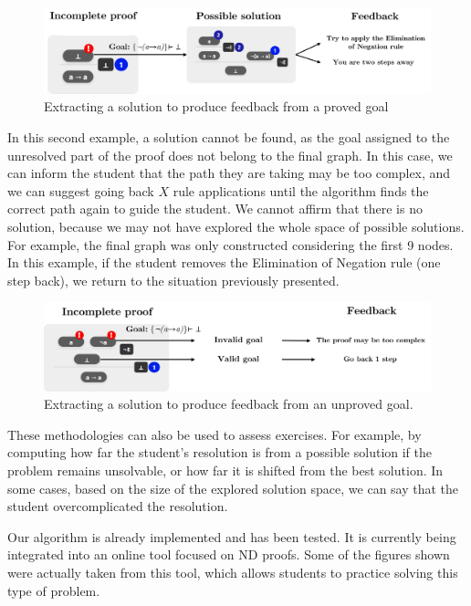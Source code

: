 \begin{figure}
    \centering
    \includegraphics[width=1\linewidth]{resources/trim-pos-feed.jpg}
    \caption{Extracting a solution to produce feedback from a proved goal}
    \label{fig:extract-solution}
\end{figure}

In this second example, a solution cannot be found, as the goal assigned to the unresolved part of the proof does not belong to the final graph. In this case, we can inform the student that the path they are taking may be too complex, and we can suggest going back \(X\) rule applications until the algorithm finds the correct path again to guide the student. We cannot affirm that there is no solution, because we may not have explored the whole space of possible solutions. For example, the final graph was only constructed considering the first 9 nodes. In this example, if the student removes the Elimination of Negation rule (one step back), we return to the situation previously presented.

\begin{figure}
    \centering
    \includegraphics[width=1\linewidth]{resources/trim-neg-feed.jpg}
    \caption{Extracting a solution to produce feedback from an unproved goal.}
    \label{fig:extract-solution2}
\end{figure}

These methodologies can also be used to assess exercises. For example, by computing how far the student’s resolution is from a possible solution if the problem remains unsolvable, or how far it is shifted from the best solution. In some cases, based on the size of the explored solution space, we can say that the student overcomplicated the resolution.

Our algorithm is already implemented and has been tested. It is currently being integrated into an online tool focused on ND proofs. Some of the figures shown were actually taken from this tool, which allows students to practice solving this type of problem.
